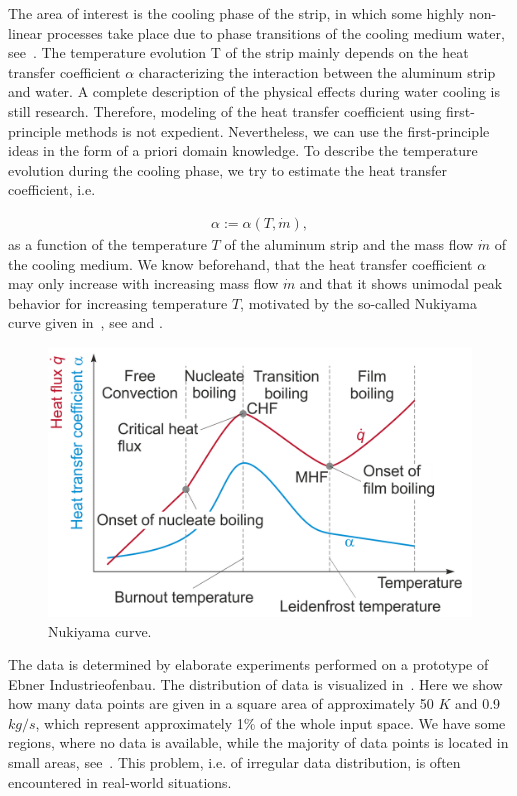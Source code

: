 The area of interest is the cooling phase of the strip, in which some highly non-linear processes take place due to phase transitions of the cooling medium water, see~. The temperature evolution T of the strip mainly depends on the heat transfer coefficient $\alpha$ characterizing the interaction between the aluminum strip and water. A complete description of the physical effects during water cooling is still research. Therefore, modeling of the heat transfer coefficient using first-principle methods is not expedient. Nevertheless, we can use the first-principle ideas in the form of a priori domain knowledge. To describe the temperature evolution during the cooling phase, we try to estimate the heat transfer coefficient, i.e.

\begin{align}
	\alpha := \alpha(T, \dot m),
\end{align}
%
as a function of the temperature $T$ of the aluminum strip and the mass flow $\dot m$ of the cooling medium. We know beforehand, that the heat transfer coefficient $\alpha$ may only increase with increasing mass flow $\dot m$ and that it shows unimodal peak behavior for increasing temperature $T$, motivated by the so-called Nukiyama curve given in~, see \cite{mayinger2013stromung} and \cite{baehr2006heatandmasstransfer}.
	  
\begin{figure}[H]
	\centering
	\includegraphics[width=0.8\columnwidth]{graphics/pgfplots/cha5/Ebner/Nukiyama_Curve.png}
	\caption{Nukiyama curve.}
	\label{fig:ebner_nukiyama}
\end{figure}

The data is determined by elaborate experiments performed on a prototype of Ebner Industrieofenbau. The distribution of data is visualized in~. Here we show how many data points are given in a square area of approximately 50 $\si{K}$ and 0.9 $\si{kg}/\si{s}$, which represent approximately 1\% of the whole input space. We have some regions, where no data is available, while the majority of data points is located in small areas, see~. This problem, i.e. of irregular data distribution, is often encountered in real-world situations. 

